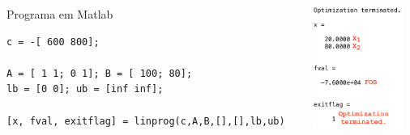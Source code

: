 \documentclass{beamer}
\begin{document}
\begin{frame}[fragile]
\begin{columns}
\begin{column}{6cm}
\begin{block}{Programa em Matlab}
\begin{lstlisting}[basicstyle=\tiny]
c = -[ 600 800];

A = [ 1 1; 0 1]; B = [ 100; 80];
lb = [0 0]; ub = [inf inf];

[x, fval, exitflag] = linprog(c,A,B,[],[],lb,ub)
				\end{lstlisting}			
			\end{block}
		\end{column} \pause
		\begin{column}{6cm}
			\centering
			\includegraphics[width=3cm,height=4cm]{Elimina_Matlab_3.png}
		\end{column}
	\end{columns}	
\end{frame}
\end{document}

